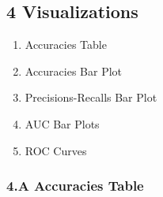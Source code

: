 \documentclass[11pt]{article}
\providecommand{\tightlist}{%
      \setlength{\itemsep}{0pt}\setlength{\parskip}{0pt}}
\begin{document}
    \hypertarget{visualizations}{%
\subsection{4 Visualizations}\label{visualizations}}

\begin{enumerate}
\def\labelenumi{\arabic{enumi}.}
\tightlist
\item
  Accuracies Table
\item
  Accuracies Bar Plot
\item
  Precisions-Recalls Bar Plot
\item
  AUC Bar Plots
\item
  ROC Curves
\end{enumerate}

    \hypertarget{a-accuracies-table}{%
\subsubsection{4.A Accuracies Table}\label{a-accuracies-table}}
\end{document}
